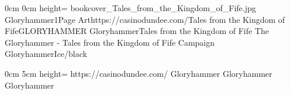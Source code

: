 \documentclass[letterpaper,openany,twoside,twocolumn]{book}
\begin{document}
	\DungeonSheetGeometry

		{0cm}%
		{0cm}%
		{height=\paperheight}%
		{bookcover_Tales_from_the_Kingdom_of_Fife.jpg}%
		{%
			{Gloryhammer1}{Page \thepage}{Art}{https://casinodundee.com/}{Tales from the Kingdom of Fife}{GLORYHAMMER}%
		}%
		{{\darkcrystalfont}{Gloryhammer}{\digitalfont}{Tales from the Kingdom of Fife}}%
		{{\digitalfont}{The Gloryhammer - Tales from the Kingdom of Fife Campaign}}%
		{GloryhammerIce/black}%
	
	\clearpage
	\setcounter{tocdepth}{2}
	\tableofcontents
	
	\DndSetThemeColor[PhbTan]
	
	
	
	
	
	
	
	
	
	
	
	
	
	
	
	
	
	
	
	
		{0cm}								%
		{5cm}								%
		{height=\paperheight}				%
		{https://casinodundee.com/}			%
		{Gloryhammer}						%
		{Gloryhammer}						%
		{Gloryhammer}						%
	
\end{document}
